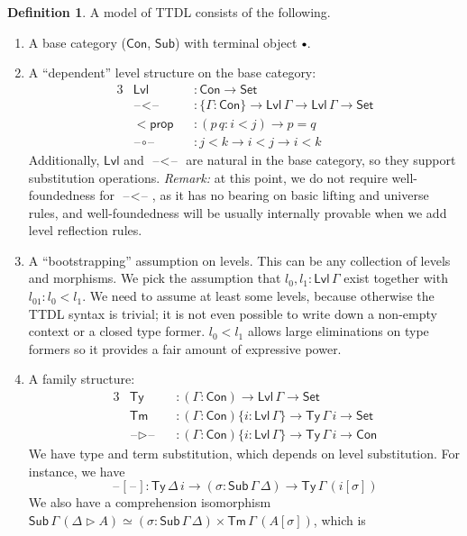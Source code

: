 \documentclass[a4paper,UKenglish,cleveref, autoref, thm-restate]{lipics-v2021}
\theoremstyle{remark}
\theoremstyle{definition}
\newtheorem{mydefinition}{Definition}
\newcommand{\Seti}{\mathsf{Set}}
\newcommand{\Con}{\mathsf{Con}}
\newcommand{\Ty}{\mathsf{Ty}}
\newcommand{\Tm}{\mathsf{Tm}}
\newcommand{\Sub}{\mathsf{Sub}}
\newcommand{\emptycon}{\scaleobj{.75}\bullet}
\newcommand{\ext}{\triangleright}
\newcommand{\blank}{\mathord{\hspace{1pt}\text{--}\hspace{1pt}}}
\newcommand{\Lvl}{\mathsf{Lvl}}
\newcommand{\msf}[1]{\mathsf{#1}}
\begin{document}
\begin{mydefinition} A model of TTDL consists of the following.
\begin{enumerate}
\item
  A base category ($\Con$, $\Sub$) with terminal object $\emptycon$.
\item
  A ``dependent'' level structure on the base category:
  \begin{alignat*}{3}
    &\Lvl                  &&: \Con \to \Seti\\
    &\blank\!<\!\blank     &&: \{\Gamma : \Con\} \to \Lvl\,\Gamma \to \Lvl\,\Gamma \to \Seti\\
    &<\!\msf{prop}         &&: (p\,q : i < j) \to p = q\\
    &\blank\!\circ\!\blank &&: j < k \to i < j \to i < k
  \end{alignat*}
  Additionally, $\Lvl$ and $\blank\!<\!\blank$ are natural in the base category,
  so they support substitution operations. \emph{Remark:} at this point, we do not require well-foundedness
  for $\blank\!<\!\blank$, as it has no bearing on basic lifting and universe rules, and
  well-foundedness will be usually internally provable when we add level reflection rules.
\item
  A ``bootstrapping'' assumption on levels. This can be any collection of levels
  and morphisms. We pick the assumption that $l_0, l_1 : \Lvl\,\Gamma$ exist
  together with $l_{01} : l_0 < l_1$. We need to assume at least some levels,
  because otherwise the TTDL syntax is trivial; it is not even possible to
  write down a non-empty context or a closed type former. $l_0 < l_1$ allows large
  eliminations on type formers so it provides a fair amount of expressive power.
\item
  A family structure:
  \begin{alignat*}{3}
    &\Ty &&: (\Gamma : \Con) \to \Lvl\,\Gamma \to \Seti\\
    &\Tm &&: (\Gamma : \Con)\{i : \Lvl\,\Gamma\} \to \Ty\,\Gamma\,i \to \Seti\\
    &\blank\ext\blank &&: (\Gamma : \Con)\{i : \Lvl\,\Gamma\} \to \Ty\,\Gamma\,i \to \Con
  \end{alignat*}
  We have type and term substitution, which depends on level substitution. For instance, we have
  \[
    \blank[\blank] : \Ty\,\Delta\,i \to (\sigma : \Sub\,\Gamma\,\Delta) \to \Ty\,\Gamma\,(i[\sigma])
  \]
  We also have a comprehension isomorphism $\Sub\,\Gamma\,(\Delta \ext A) \simeq
  (\sigma : \Sub\,\Gamma\,\Delta)\times \Tm\,\Gamma\,(A[\sigma])$, which is

\end{enumerate}
\end{mydefinition}
\end{document}
